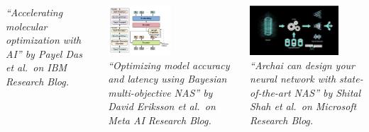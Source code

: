 \documentclass[aspectratio=169]{beamer}
\begin{document}
\begin{frame}
\begin{columns}
\begin{column}{0.33\textwidth}
\begin{center}
{\tiny \sl
``Accelerating molecular optimization with AI'' by Payel Das et al.\
on IBM Research Blog.\\
}
\end{center}
\end{column}
\begin{column}{0.33\textwidth}
\begin{center}
\includegraphics[height=5em]{../img/probs/meta-nas.png}\\
{\tiny \sl
``Optimizing model accuracy and latency using Bayesian multi-objective NAS''
by David Eriksson et al.\ on Meta AI Research Blog.\\
}
\end{center}
\end{column}
\begin{column}{0.33\textwidth}
\begin{center}
\includegraphics[height=5em]{../img/probs/microsoft-nas.png}\\
{\tiny \sl
``Archai can design your neural network with state-of-the-art NAS''
by Shital Shah et al.\ on Microsoft Research Blog.\\
}
\end{center}
\end{column}
\end{columns}
\end{frame}
%
\end{document}
